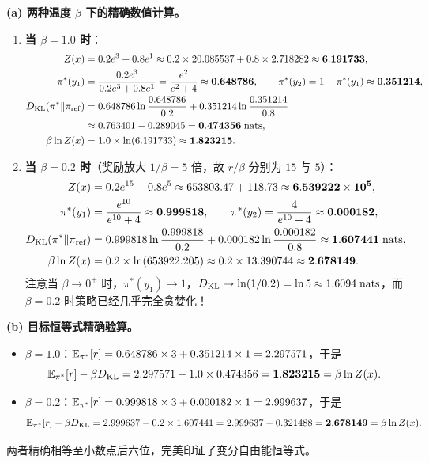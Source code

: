 \textbf{(a) 两种温度 $\beta$ 下的精确数值计算。}
\begin{enumerate}
  \item \textbf{当 $\beta = 1.0$ 时}：
  \begin{align*}
    Z(x) &= 0.2 e^3 + 0.8 e^1 \approx 0.2 \times 20.085537 + 0.8 \times 2.718282 \approx \mathbf{6.191733}, \\
    \pi^*(y_1) &= \frac{0.2 e^3}{0.2 e^3 + 0.8 e^1} = \frac{e^2}{e^2 + 4} \approx \mathbf{0.648786}, \qquad
    \pi^*(y_2) = 1 - \pi^*(y_1) \approx \mathbf{0.351214}, \\
    D_{\mathrm{KL}}(\pi^* \| \pi_{\mathrm{ref}}) &= 0.648786 \ln\frac{0.648786}{0.2} + 0.351214 \ln\frac{0.351214}{0.8} \\
    &\approx 0.763401 - 0.289045 = \mathbf{0.474356\;\text{nats}}, \\
    \beta \ln Z(x) &= 1.0 \times \ln(6.191733) \approx \mathbf{1.823215}.
  \end{align*}
  \item \textbf{当 $\beta = 0.2$ 时}（奖励放大 $1/\beta = 5$ 倍，故 $r/\beta$ 分别为 $15$ 与 $5$）：
  \begin{align*}
    Z(x) &= 0.2 e^{15} + 0.8 e^{5} \approx 653803.47 + 118.73 \approx \mathbf{6.539222 \times 10^5}, \\
    \pi^*(y_1) &= \frac{e^{10}}{e^{10} + 4} \approx \mathbf{0.999818}, \qquad
    \pi^*(y_2) = \frac{4}{e^{10} + 4} \approx \mathbf{0.000182}, \\
    D_{\mathrm{KL}}(\pi^* \| \pi_{\mathrm{ref}}) &= 0.999818 \ln\frac{0.999818}{0.2} + 0.000182 \ln\frac{0.000182}{0.8} \approx \mathbf{1.607441\;\text{nats}}, \\
    \beta \ln Z(x) &= 0.2 \times \ln(653922.205) \approx 0.2 \times 13.390744 \approx \mathbf{2.678149}.
  \end{align*}
  注意当 $\beta \to 0^+$ 时，$\pi^*(y_1) \to 1$，$D_{\mathrm{KL}} \to \ln(1/0.2) = \ln 5 \approx 1.6094\;\text{nats}$，而 $\beta = 0.2$ 时策略已经几乎完全贪婪化！
\end{enumerate}

\textbf{(b) 目标恒等式精确验算。}
\begin{itemize}
  \item $\beta = 1.0$：$\mathbb{E}_{\pi^*}[r] = 0.648786 \times 3 + 0.351214 \times 1 = 2.297571$，于是
  \[
    \mathbb{E}_{\pi^*}[r] - \beta D_{\mathrm{KL}} = 2.297571 - 1.0 \times 0.474356 = \mathbf{1.823215} = \beta \ln Z(x).
  \]
  \item $\beta = 0.2$：$\mathbb{E}_{\pi^*}[r] = 0.999818 \times 3 + 0.000182 \times 1 = 2.999637$，于是
  \[
    \mathbb{E}_{\pi^*}[r] - \beta D_{\mathrm{KL}} = 2.999637 - 0.2 \times 1.607441 = 2.999637 - 0.321488 = \mathbf{2.678149} = \beta \ln Z(x).
  \]
\end{itemize}
两者精确相等至小数点后六位，完美印证了变分自由能恒等式。

